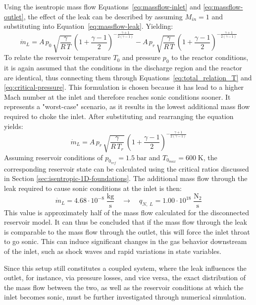 	Using the isentropic mass flow Equations~\eqref{eq:massflow-inlet} and \eqref{eq:massflow-outlet}, the effect of the leak can be described by assuming $M_{in} = 1$ and substituting into Equation~\eqref{eq:massflow-leak}.
	Yielding:
	$$
	    \dot{m}_L =
	    A\, p_0\, \sqrt{\frac{\gamma}{R\,T}}\, \left(1+\frac{\gamma-1}{2}\right)^{-\frac{\gamma+1}{2(\gamma-1)}}
	    - A\, p_r\, \sqrt{\frac{\gamma}{R\,T}}\, \left(1+\frac{\gamma-1}{2}\right)^{-\frac{\gamma+1}{2(\gamma-1)}}
	$$
	To relate the reservoir temperature $T_0$ and pressure $p_0$ to the reactor conditions, it is again assumed that the conditions in the discharge region and the reactor are identical, thus connecting them through Equations~\eqref{eq:total_relation_T} and \eqref{eq:critical-pressure}.
	This formulation is chosen because it has lead to a higher Mach number at the inlet and therefore reaches sonic conditions sooner.
	It represents a "worst-case" scenario, as it results in the lowest additional mass flow required to choke the inlet.
	After substituting and rearranging the equation yields:
	\begin{equation}
	    \dot{m}_L =
	    A\, p_r\, \sqrt{\frac{\gamma}{R\, T_r}}\,
	    \left(1 + \frac{\gamma - 1}{2}\right)^{-\frac{\gamma + 1}{2(\gamma - 1)}}
	\end{equation}
	Assuming reservoir conditions of $p_{0_{ref}} = 1.5\;\text{bar}$ and $T_{0_{max}} = 600\;\text{K}$, the corresponding reservoir state can be calculated using the critical ratios discussed in Section \ref{sec:isentropic-1D-foundations}.
	The additional mass flow through the leak required to cause sonic conditions at the inlet is then:
	$$
	    \dot{m}_L = 4.68 \cdot 10^{-8} \; \frac{\text{kg}}{\text{s}}
			\quad \rightarrow \quad
		q_{N,\;L} = 1.00 \cdot 10^{18} \; \frac{\text{N}_2}{\text{s}}
	$$
	This value is approximately half of the mass flow calculated for the disconnected reservoir model.
	It can thus be concluded that if the mass flow through the leak is comparable to the mass flow through the outlet, this will force the inlet throat to go sonic.
	This can induce significant changes in the gas behavior downstream of the inlet, such as shock waves and rapid variations in state variables.

	Since this setup still constitutes a coupled system, where the leak influences the outlet, for instance, via pressure losses, and vice versa, the exact distribution of the mass flow between the two, as well as the reservoir conditions at which the inlet becomes sonic, must be further investigated through numerical simulation.
